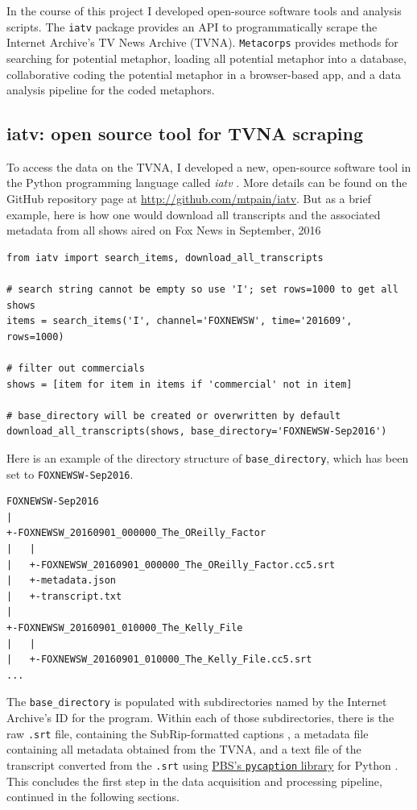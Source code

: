 In the course of this project I developed open-source software tools and
analysis scripts. The \texttt{iatv} package provides an API to programmatically
scrape the Internet Archive's TV News Archive (TVNA). \texttt{Metacorps}
provides methods for searching for potential metaphor, loading all potential
metaphor into a database, collaborative coding the potential metaphor in a 
browser-based app, and a data analysis pipeline for the coded metaphors. 

\subsection{iatv: open source tool for TVNA scraping}
\label{subsec:iatv}

To access the data on the TVNA, I developed a new, open-source 
software tool in the Python programming language called \textit{iatv}
\cite{Turner2016}. More details can be found on the GitHub repository page
at \url{http://github.com/mtpain/iatv}. But as a brief example, here is
how one would download all transcripts and the associated metadata from
all shows aired on Fox News in September, 2016

\begin{verbatim}
from iatv import search_items, download_all_transcripts

# search string cannot be empty so use 'I'; set rows=1000 to get all shows 
items = search_items('I', channel='FOXNEWSW', time='201609', rows=1000)

# filter out commercials
shows = [item for item in items if 'commercial' not in item]

# base_directory will be created or overwritten by default
download_all_transcripts(shows, base_directory='FOXNEWSW-Sep2016')
\end{verbatim}

Here is an example of the directory structure of \texttt{base\_directory}, which
has been set to \texttt{FOXNEWSW-Sep2016}.

{\small
\begin{verbatim} 
FOXNEWSW-Sep2016
|
+-FOXNEWSW_20160901_000000_The_OReilly_Factor
|   |
|   +-FOXNEWSW_20160901_000000_The_OReilly_Factor.cc5.srt
|   +-metadata.json
|   +-transcript.txt
|
+-FOXNEWSW_20160901_010000_The_Kelly_File
|   |
|   +-FOXNEWSW_20160901_010000_The_Kelly_File.cc5.srt
...
\end{verbatim}
}

\noindent
The \texttt{base\_directory} is populated with subdirectories named by the Internet
Archive's ID for the program. Within each of those subdirectories, there is
the raw \texttt{.srt} file, containing the SubRip-formatted captions 
\cite{Matroska2016}, a metadata file containing all metadata obtained from the
TVNA, and a text file of the transcript converted from the \texttt{.srt} using
\href{https://github.com/pbs/pycaption}{PBS's \texttt{pycaption} library} for Python
\cite{PBS2016}. This concludes the first step in the data acquisition and
processing pipeline, continued in the following sections.


